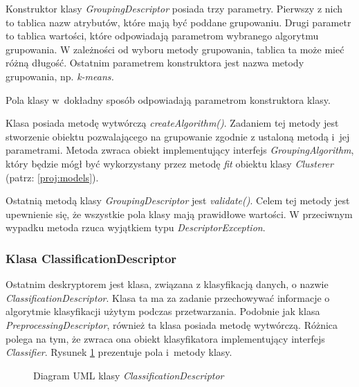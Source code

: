 \documentclass[../thesis.tex]{subfiles}
\begin{document}
Konstruktor klasy \emph{GroupingDescriptor} posiada trzy parametry. Pierwszy z nich to tablica nazw atrybutów, które mają być poddane grupowaniu. Drugi parametr to tablica wartości, które odpowiadają parametrom wybranego algorytmu grupowania. W zależności od wyboru metody grupowania, tablica ta może mieć różną długość. Ostatnim parametrem konstruktora jest nazwa metody grupowania, np. \emph{k-means.}

Pola klasy w~dokładny sposób odpowiadają parametrom konstruktora klasy.

Klasa posiada metodę wytwórczą \emph{createAlgorithm()}. Zadaniem tej metody jest stworzenie obiektu pozwalającego na grupowanie zgodnie z ustaloną metodą i~jej parametrami. Metoda zwraca obiekt implementujący interfejs \emph{GroupingAlgorithm}, który będzie mógł być wykorzystany przez metodę \emph{fit} obiektu klasy \emph{Clusterer} (patrz: \ref{proj:models}).

Ostatnią metodą klasy \emph{GroupingDescriptor} jest \emph{validate()}. Celem tej metody jest upewnienie się, że wszystkie pola klasy mają prawidłowe wartości. W przeciwnym wypadku metoda rzuca wyjątkiem typu \emph{DescriptorException}.

\subsubsection{Klasa ClassificationDescriptor}

Ostatnim deskryptorem jest klasa, związana z klasyfikacją danych, o nazwie \emph{ClassificationDescriptor}. Klasa ta ma za zadanie przechowywać informacje o algorytmie klasyfikacji użytym podczas przetwarzania. Podobnie jak klasa \emph{PreprocessingDescriptor}, również ta klasa posiada metodę wytwórczą. Różnica polega na tym, że zwraca ona obiekt klasyfikatora implementujący interfejs \emph{Classifier}. Rysunek \ref{proj:diagram_classification_descriptor} prezentuje pola i~metody klasy.

\begin{figure}[h]
\centering
{}
\caption{Diagram UML klasy \emph{ClassificationDescriptor}}
\label{proj:diagram_classification_descriptor}
\end{figure}
\end{document}
